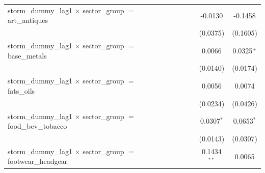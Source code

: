 \begin{tabular}{lcccccccc}
   storm\_dummy\_lag1 $\times$ sector\_group $=$ art\_antiques                    &                       &                       &                       &                       &                       &                       & -0.0130               & -0.1458\\   
                                                                                  &                       &                       &                       &                       &                       &                       & (0.0375)              & (0.1605)\\   
   storm\_dummy\_lag1 $\times$ sector\_group $=$ base\_metals                     &                       &                       &                       &                       &                       &                       & 0.0066                & 0.0325$^{+}$\\   
                                                                                  &                       &                       &                       &                       &                       &                       & (0.0140)              & (0.0174)\\   
   storm\_dummy\_lag1 $\times$ sector\_group $=$ fats\_oils                       &                       &                       &                       &                       &                       &                       & 0.0056                & 0.0074\\   
                                                                                  &                       &                       &                       &                       &                       &                       & (0.0234)              & (0.0426)\\   
   storm\_dummy\_lag1 $\times$ sector\_group $=$ food\_bev\_tobacco               &                       &                       &                       &                       &                       &                       & 0.0307$^{*}$          & 0.0653$^{*}$\\   
                                                                                  &                       &                       &                       &                       &                       &                       & (0.0143)              & (0.0307)\\   
   storm\_dummy\_lag1 $\times$ sector\_group $=$ footwear\_headgear               &                       &                       &                       &                       &                       &                       & 0.1434$^{**}$         & 0.0065\\   

\end{tabular}
